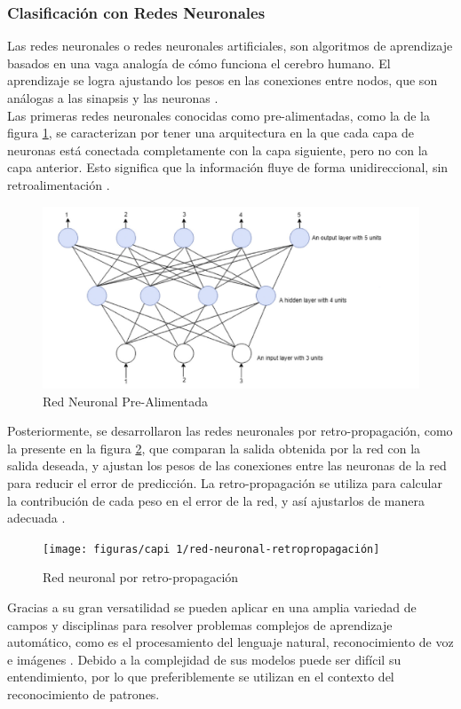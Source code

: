 \subsubsection{Clasificación con Redes Neuronales}
Las redes neuronales o redes neuronales artificiales, son algoritmos de aprendizaje basados en una vaga analogía de cómo funciona el cerebro humano. El aprendizaje se logra ajustando los pesos en las conexiones entre nodos, que son análogas a las sinapsis y las neuronas \citep{sammut2011encyclopedia}. \\
Las primeras redes neuronales conocidas como pre-alimentadas, como la de la figura \ref{fig:red-neuronal-prealimentada}, se caracterizan por tener una arquitectura en la que cada capa de neuronas está conectada completamente con la capa siguiente, pero no con la capa anterior. Esto significa que la información fluye de forma unidireccional, sin retroalimentación \citep{abiodun2018state}. 
\begin{figure}[H]
	\centering
	\includegraphics[width=0.7\linewidth]{figuras/capi 1/red-neuronal-prealimentada}
	\caption{Red Neuronal Pre-Alimentada \citep{abiodun2018state}}
	\label{fig:red-neuronal-prealimentada}
\end{figure}
Posteriormente, se desarrollaron las redes neuronales por retro-propagación, como la presente en la figura \ref{fig:red-neuronal-retropropagacion}, que comparan la salida obtenida por la red con la salida deseada, y ajustan los pesos de las conexiones entre las neuronas de la red para reducir el error de predicción. La retro-propagación se utiliza para calcular la contribución de cada peso en el error de la red, y así ajustarlos de manera adecuada \citep{abiodun2018state}.
\begin{figure}[H]
	\centering
	\texttt{[image: figuras/capi 1/red-neuronal-retropropagación]}
	\caption{Red neuronal por retro-propagación \citep{abiodun2018state}}
	\label{fig:red-neuronal-retropropagacion}
\end{figure}
Gracias a su gran versatilidad se pueden aplicar en una amplia variedad de campos y disciplinas para resolver problemas complejos de aprendizaje automático, como es el procesamiento del lenguaje natural, reconocimiento de voz e imágenes \citep{abiodun2018state}. Debido a la complejidad de sus modelos puede ser difícil su entendimiento, por lo que preferiblemente se utilizan en el contexto del reconocimiento de patrones.

